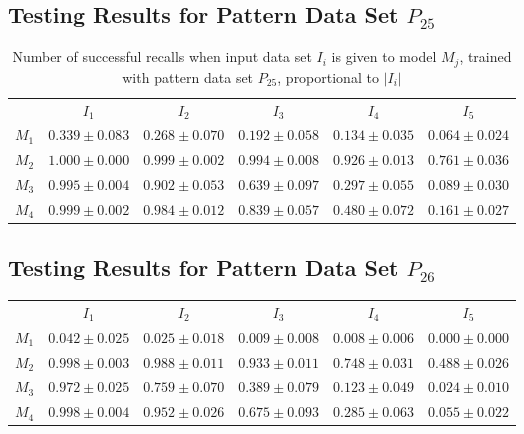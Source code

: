 \documentclass[12pt]{article}
\begin{document}
\begin{appendices}
\subsection{Testing Results for Pattern Data Set $P_{25}$}


    \begin{table}[H]
    \centering
    \def\arraystretch{1.5}
    \footnotesize
    \begin{tabular}{cccccc}
    
 & $I_{1}$  & $I_{2}$  & $I_{3}$  & $I_{4}$  & $I_{5}$ \\ \cline{2-6}
$M_{1}$  & $0.339\pm0.083$  & $0.268\pm0.070$  & $0.192\pm0.058$  & $0.134\pm0.035$  & $0.064\pm0.024$ \\
$M_{2}$  & $1.000\pm0.000$  & $0.999\pm0.002$  & $0.994\pm0.008$  & $0.926\pm0.013$  & $0.761\pm0.036$ \\
$M_{3}$  & $0.995\pm0.004$  & $0.902\pm0.053$  & $0.639\pm0.097$  & $0.297\pm0.055$  & $0.089\pm0.030$ \\
$M_{4}$  & $0.999\pm0.002$  & $0.984\pm0.012$  & $0.839\pm0.057$  & $0.480\pm0.072$  & $0.161\pm0.027$ \\

    \end{tabular}
    \caption{Number of successful recalls when input data set $I_i$ is given to model $M_j$, trained with pattern data set $P_{25}$, proportional to $\left|I_i\right|$}
    \end{table}
    
\subsection{Testing Results for Pattern Data Set $P_{26}$}


    \begin{table}[H]
    \centering
    \def\arraystretch{1.5}
    \footnotesize
    \begin{tabular}{cccccc}
    
 & $I_{1}$  & $I_{2}$  & $I_{3}$  & $I_{4}$  & $I_{5}$ \\ \cline{2-6}
$M_{1}$  & $0.042\pm0.025$  & $0.025\pm0.018$  & $0.009\pm0.008$  & $0.008\pm0.006$  & $0.000\pm0.000$ \\
$M_{2}$  & $0.998\pm0.003$  & $0.988\pm0.011$  & $0.933\pm0.011$  & $0.748\pm0.031$  & $0.488\pm0.026$ \\
$M_{3}$  & $0.972\pm0.025$  & $0.759\pm0.070$  & $0.389\pm0.079$  & $0.123\pm0.049$  & $0.024\pm0.010$ \\
$M_{4}$  & $0.998\pm0.004$  & $0.952\pm0.026$  & $0.675\pm0.093$  & $0.285\pm0.063$  & $0.055\pm0.022$ \\


\end{tabular}
\end{table}
\end{appendices}
\end{document}
